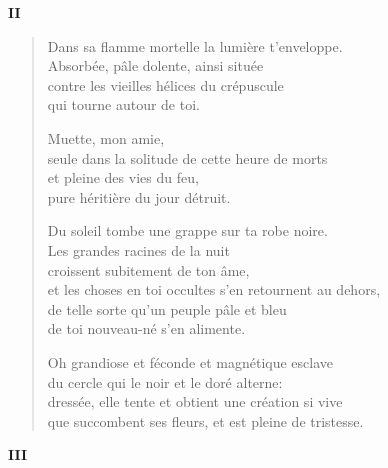 \documentclass[11pt,a4paper]{book}
\begin{document}
\newpage


\begin{center} \textbf{II} \end{center}

\bigskip

\begin{verse}
  Dans sa flamme mortelle la lumière t'enveloppe. \\
  Absorbée, pâle dolente, ainsi située \\
  contre les vieilles hélices du crépuscule \\
  qui tourne autour de toi.

  Muette, mon amie, \\
  seule dans la solitude de cette heure de morts \\
  et pleine des vies du feu, \\
  pure héritière du jour détruit.

  Du soleil tombe une grappe sur ta robe noire. \\
  Les grandes racines de la nuit\\
  croissent subitement de ton âme, \\
  et les choses en toi occultes s'en retournent au dehors, \\
  de telle sorte qu'un peuple pâle et bleu \\
  de toi nouveau-né s'en alimente.

  Oh grandiose et féconde et magnétique esclave \\
  du cercle qui le noir et le doré alterne: \\
  dressée, elle tente et obtient une création si vive \\
  que succombent ses fleurs, et est pleine de tristesse.
\end{verse}

\newpage


\begin{center} \textbf{III} \end{center}

\bigskip
\end{document}
